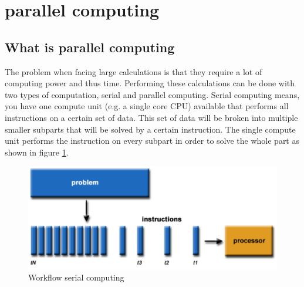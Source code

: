 \documentclass[a4paper, 11pt]{report}
\begin{document}
\section{parallel computing}
	\subsection{What is parallel computing}
The problem when facing large calculations is that they require a lot of computing power and thus time. Performing these calculations can be done with two types of computation, serial and parallel computing. Serial computing means, you have one compute unit (e.g. a single core CPU) available that performs all instructions on a certain set of data. This set of data will be broken into multiple smaller subparts that will be solved by a certain instruction. The single compute unit performs the instruction on every subpart in order to solve the whole part as shown in figure \ref{fig:SerialC}.
	\begin{figure}[ht]
		\centering
		\includegraphics[scale=.4]{images/serialProblem.pdf}
		\caption{Workflow serial computing}
		\label{fig:SerialC}
	\end{figure}
\end{document}
